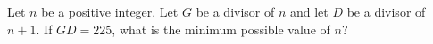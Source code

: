 Let $n$ be a positive integer. Let $G$ be a divisor of $n$ and let $D$ be a divisor of $n+1$. If $GD=225$, what is the minimum possible value of $n$?
